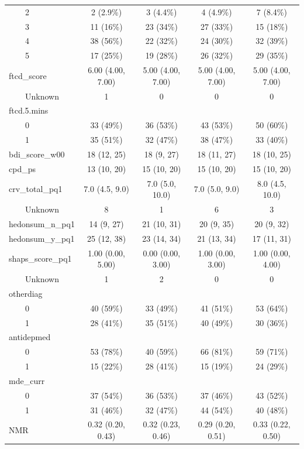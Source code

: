 \documentclass[
  letterpaper,
  DIV=11,
  numbers=noendperiod]{scrartcl}
\begin{document}
\begin{longtable*}{lcccc}
    2 & 2 (2.9\%) & 3 (4.4\%) & 4 (4.9\%) & 7 (8.4\%) \\ 
    3 & 11 (16\%) & 23 (34\%) & 27 (33\%) & 15 (18\%) \\ 
    4 & 38 (56\%) & 22 (32\%) & 24 (30\%) & 32 (39\%) \\ 
    5 & 17 (25\%) & 19 (28\%) & 26 (32\%) & 29 (35\%) \\ 
ftcd\_score & 6.00 (4.00, 7.00) & 5.00 (4.00, 7.00) & 5.00 (4.00, 7.00) & 5.00 (4.00, 7.00) \\ 
    Unknown & 1 & 0 & 0 & 0 \\ 
ftcd.5.mins &  &  &  &  \\ 
    0 & 33 (49\%) & 36 (53\%) & 43 (53\%) & 50 (60\%) \\ 
    1 & 35 (51\%) & 32 (47\%) & 38 (47\%) & 33 (40\%) \\ 
bdi\_score\_w00 & 18 (12, 25) & 18 (9, 27) & 18 (11, 27) & 18 (10, 25) \\ 
cpd\_ps & 13 (10, 20) & 15 (10, 20) & 15 (10, 20) & 15 (10, 20) \\ 
crv\_total\_pq1 & 7.0 (4.5, 9.0) & 7.0 (5.0, 10.0) & 7.0 (5.0, 9.0) & 8.0 (4.5, 10.0) \\ 
    Unknown & 8 & 1 & 6 & 3 \\ 
hedonsum\_n\_pq1 & 14 (9, 27) & 21 (10, 31) & 20 (9, 35) & 20 (9, 32) \\ 
hedonsum\_y\_pq1 & 25 (12, 38) & 23 (14, 34) & 21 (13, 34) & 17 (11, 31) \\ 
shaps\_score\_pq1 & 1.00 (0.00, 5.00) & 0.00 (0.00, 3.00) & 1.00 (0.00, 3.00) & 1.00 (0.00, 4.00) \\ 
    Unknown & 1 & 2 & 0 & 0 \\ 
otherdiag &  &  &  &  \\ 
    0 & 40 (59\%) & 33 (49\%) & 41 (51\%) & 53 (64\%) \\ 
    1 & 28 (41\%) & 35 (51\%) & 40 (49\%) & 30 (36\%) \\ 
antidepmed &  &  &  &  \\ 
    0 & 53 (78\%) & 40 (59\%) & 66 (81\%) & 59 (71\%) \\ 
    1 & 15 (22\%) & 28 (41\%) & 15 (19\%) & 24 (29\%) \\ 
mde\_curr &  &  &  &  \\ 
    0 & 37 (54\%) & 36 (53\%) & 37 (46\%) & 43 (52\%) \\ 
    1 & 31 (46\%) & 32 (47\%) & 44 (54\%) & 40 (48\%) \\ 
NMR & 0.32 (0.20, 0.43) & 0.32 (0.23, 0.46) & 0.29 (0.20, 0.51) & 0.33 (0.22, 0.50) \\ 

\end{longtable*}
\end{document}

